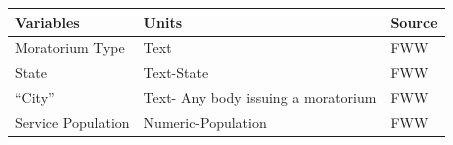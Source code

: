 \documentclass[
  12pt,
]{article}
\begin{document}
\begin{longtable}[]{@{}lll@{}}
\toprule
\begin{minipage}[b]{0.24\columnwidth}\raggedright
Variables\strut
\end{minipage} & \begin{minipage}[b]{0.58\columnwidth}\raggedright
Units\strut
\end{minipage} & \begin{minipage}[b]{0.09\columnwidth}\raggedright
Source\strut
\end{minipage}\tabularnewline
\midrule
\endhead
\begin{minipage}[t]{0.24\columnwidth}\raggedright
Moratorium Type\strut
\end{minipage} & \begin{minipage}[t]{0.58\columnwidth}\raggedright
Text\strut
\end{minipage} & \begin{minipage}[t]{0.09\columnwidth}\raggedright
FWW\strut
\end{minipage}\tabularnewline
\begin{minipage}[t]{0.24\columnwidth}\raggedright
State\strut
\end{minipage} & \begin{minipage}[t]{0.58\columnwidth}\raggedright
Text-State\strut
\end{minipage} & \begin{minipage}[t]{0.09\columnwidth}\raggedright
FWW\strut
\end{minipage}\tabularnewline
\begin{minipage}[t]{0.24\columnwidth}\raggedright
``City''\strut
\end{minipage} & \begin{minipage}[t]{0.58\columnwidth}\raggedright
Text- Any body issuing a moratorium\strut
\end{minipage} & \begin{minipage}[t]{0.09\columnwidth}\raggedright
FWW\strut
\end{minipage}\tabularnewline
\begin{minipage}[t]{0.24\columnwidth}\raggedright
Service Population\strut
\end{minipage} & \begin{minipage}[t]{0.58\columnwidth}\raggedright
Numeric-Population\strut
\end{minipage} & \begin{minipage}[t]{0.09\columnwidth}\raggedright
FWW\strut
\end{minipage}\tabularnewline

\end{longtable}
\end{document}
